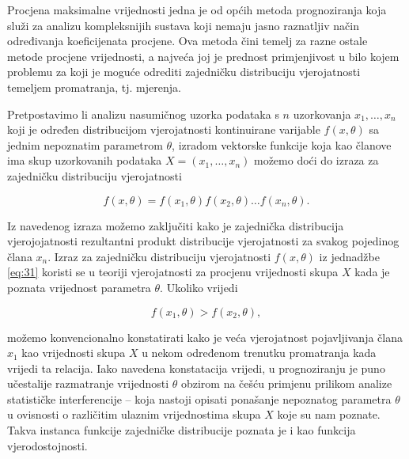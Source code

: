 \documentclass[a4paper,12pt,oneside]{memoir}
\begin{document}
                Procjena maksimalne vrijednosti jedna je od općih metoda prognoziranja koja služi za analizu kompleksnijih sustava koji nemaju jasno raznatljiv način određivanja koeficijenata procjene. Ova metoda čini temelj za razne ostale metode procjene vrijednosti, a najveća joj je prednost primjenjivost u bilo kojem problemu za koji je moguće odrediti zajedničku distribuciju vjerojatnosti temeljem promatranja, tj. mjerenja.

                Pretpostavimo li analizu nasumičnog uzorka podataka s $n$ uzorkovanja $x_1,\ldots,x_n$ koji je određen distribucijom vjerojatnosti kontinuirane varijable $f(x,\theta)$ sa jednim nepoznatim parametrom $\theta$, izradom vektorske funkcije koja kao članove ima skup uzorkovanih podataka $X=(x_1,\ldots,x_n)$ možemo doći do izraza za zajedničku distribuciju vjerojatnosti \cite{Priestley}

                \begin{equation}
                    f(x,\theta)=f(x_1,\theta)f(x_2,\theta)\ldots f(x_n,\theta).
                    \label{eq:31}
                \end{equation}

                Iz navedenog izraza možemo zaključiti kako je zajednička distribucija vjerojojatnosti rezultantni produkt distribucije vjerojatnosti za svakog pojedinog člana $x_n$. Izraz za zajedničku distribuciju vjerojatnosti $f(x,\theta)$ iz jednadžbe \ref{eq:31} koristi se u teoriji vjerojatnosti za procjenu vrijednosti skupa $X$ kada je poznata vrijednost parametra $\theta$. Ukoliko vrijedi

                \begin{equation}
                    f(x_1,\theta)> f(x_2,\theta),
                    \label{eq:32}
                \end{equation}

                možemo konvencionalno konstatirati kako je veća vjerojatnost pojavljivanja člana $x_1$ kao vrijednosti skupa $X$ u nekom određenom trenutku promatranja kada vrijedi ta relacija. Iako navedena konstatacija vrijedi, u prognoziranju je puno učestalije razmatranje vrijednosti $\theta$ obzirom na češću primjenu prilikom analize statističke interferencije -- koja nastoji opisati ponašanje nepoznatog parametra $\theta$ u ovisnosti o različitim ulaznim vrijednostima skupa $X$ koje su nam poznate. Takva instanca funkcije zajedničke distribucije poznata je i kao funkcija vjerodostojnosti.
                
\end{document}
